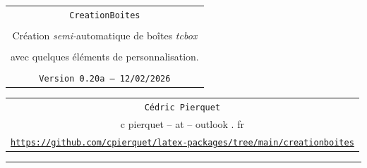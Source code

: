 \documentclass[french,11pt,a4paper]{article}
\def\TPversion{0.20a}
\def\TPdate{12/02/2026}
\begin{document}
\pagestyle{fancy}

\thispagestyle{empty}

\begin{center}
	\begin{minipage}{0.88\linewidth}
	\begin{tcolorbox}[colframe=yellow,colback=yellow!15]
		\begin{center}
			\begin{tabular}{c}
				{\Huge \texttt{CreationBoites}}\\
				\\
				{\LARGE Création \textit{semi-}automatique de boîtes \textit{tcbox}} \\
				\\
				{\LARGE avec quelques éléments de personnalisation.} \\
				\\
				{\small \texttt{Version \TPversion{} -- \TPdate}}
		\end{tabular}
		\end{center}
	\end{tcolorbox}
\end{minipage}
\end{center}

\begin{center}
	\begin{tabular}{c}
	\texttt{Cédric Pierquet}\\
	{\ttfamily c pierquet -- at -- outlook . fr}\\
	\texttt{\url{https://github.com/cpierquet/latex-packages/tree/main/creationboites}}
\end{tabular}
\end{center}

\hrule

\vfill
\end{document}
